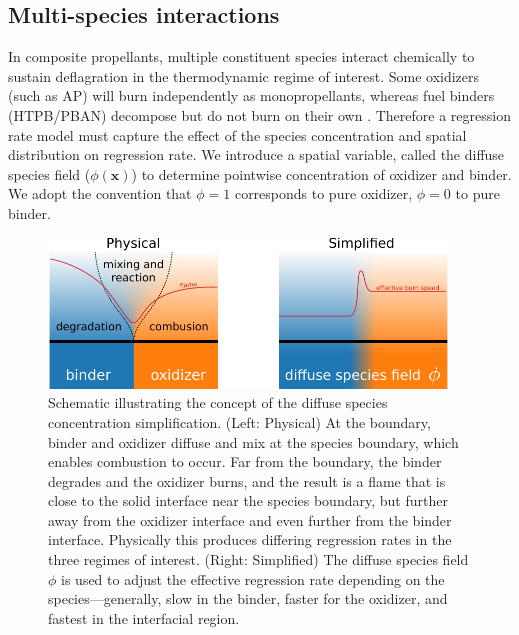 \documentclass[colorinlistoftodos,review]{elsarticle}
\begin{document}
\subsection{Multi-species interactions}

In composite propellants, multiple constituent species interact chemically to sustain deflagration in the thermodynamic regime of interest.
Some oxidizers (such as AP) will burn independently as monopropellants, whereas fuel binders (HTPB\slash PBAN) decompose but do not burn on their own \cite{ye2013analysis}.
Therefore a regression rate model must capture the effect of the species concentration and spatial distribution on regression rate.
We introduce a spatial variable, called the diffuse species field ($\phi(\bm{x})$) to determine pointwise concentration of oxidizer and binder.
We adopt the convention that $\phi=1$ corresponds to pure oxidizer, $\phi=0$ to pure binder.


\begin{figure}
  \centering
  \includegraphics[height=4cm]{figures/mix.pdf}
  \caption{
    Schematic illustrating the concept of the diffuse species concentration simplification.
    (Left: Physical) At the boundary, binder and oxidizer diffuse and mix at the species boundary, which enables combustion to occur.
    Far from the boundary, the binder degrades and the oxidizer burns, and the result is a flame that is close to the solid interface near the species boundary, but further away from the oxidizer interface and even further from the binder interface.
    Physically this produces differing regression rates in the three regimes of interest.
    (Right: Simplified) The diffuse species field $\phi$ is used to adjust the effective regression rate depending on the species---generally, slow in the binder, faster for the oxidizer, and fastest in the interfacial region.
  }
  \label{fig:mix}
\end{figure}
\end{document}

